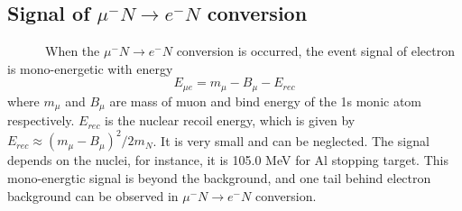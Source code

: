 \subsection{Signal of $\mu^-N \rightarrow e^-N$ conversion}
~~~~~~When the $\mu^-N \rightarrow e^-N$ conversion is occurred, the event signal of electron is mono-energetic with energy
\begin{equation}
 E_{\mu e} = m_\mu - B_\mu - E_{rec}
\end{equation}
where $m_\mu$ and $B_\mu$ are mass of muon and bind energy of the 1s monic atom respectively.
$E_{rec}$ is the nuclear recoil energy, which is given by $E_{rec} \approx (m_\mu - B_\mu)^2/2m_N$.
It is very small and can be neglected.
The signal depends on the nuclei, for instance, it is 105.0 MeV for Al stopping target.
This mono-energtic signal is beyond the background, and one tail behind electron background can be observed in $\mu^-N \rightarrow e^-N$ conversion.

